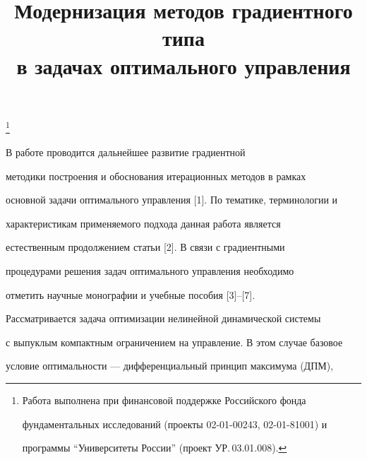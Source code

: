 

\title{Модернизация методов градиентного типа\\


в задачах оптимального управления}


\thanks{Работа выполнена при финансовой поддержке Российского фонда


фундаментальных исследований (проекты 02-01-00243, 02-01-81001) и 


программы ``Университеты России'' (проект УР.\,03.01.008).}





\date{}




\pagestyle{plain} %







\maketitle


\label{begin}





 


В работе проводится дальнейшее развитие градиентной


методики построения и обоснования итерационных методов в рамках


основной задачи оптимального управления [1]. По тематике, терминологии и 


характеристикам применяемого подхода данная работа является


естественным продолжением статьи [2]. В связи с градиентными


процедурами решения задач оптимального управления необходимо


отметить научные монографии и учебные пособия [3]--[7].





Рассматривается задача оптимизации нелинейной динамической системы


с выпуклым компактным ограничением на управление. В этом случае базовое


условие оптимальности --- дифференциальный принцип максимума (ДПМ),


